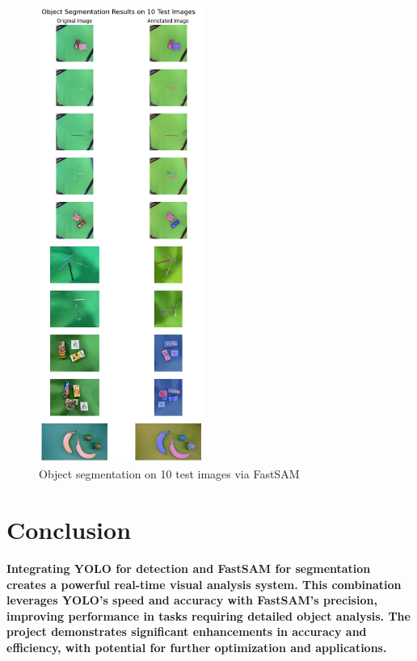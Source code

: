 \documentclass[conference]{IEEEtran}
\begin{document}
\begin{figure}[htbp]
  \centering
  \includegraphics[width=0.48\textwidth]{figures/prob5.png}
  \caption{Object segmentation on 10 test images via FastSAM}
  \label{fig:prob5}
\end{figure}

\section{Conclusion}
\textbf{
  Integrating YOLO for detection and FastSAM for segmentation creates a powerful real-time visual analysis system. This combination leverages YOLO's speed and accuracy with FastSAM's precision, improving performance in tasks requiring detailed object analysis. The project demonstrates significant enhancements in accuracy and efficiency, with potential for further optimization and applications.
}
\end{document}
